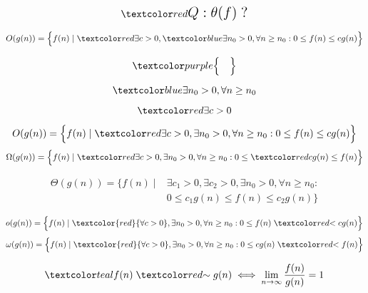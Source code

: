 
\begin{frame}{}
  \centerline{}


  \pause
  \vspace{-0.30cm}
  \[
    \red{\text{\Large $Q: \theta(f)\;?$}}
  \]
\end{frame}

\begin{frame}{}
  \[
	O(g(n)) = \Big\{f(n) \mid \red{\exists c > 0}, \blue{\exists n_0 > 0, \forall n \ge n_0}: 0 \le f(n) \le c g(n)\Big\}
  \]

  \pause
  \[
	\purple{\Big\{ \quad \Big\}}
  \]

  \pause
  \[
	\blue{\exists n_0 > 0, \forall n \ge n_0}
  \]

  \pause
  \[
	\red{\exists c > 0}
  \]
\end{frame}

\begin{frame}{}
  \[
	O(g(n)) = \Big\{f(n) \mid \red{\exists} c > 0, \exists n_0 > 0, \forall n \ge n_0: 0 \le f(n) \le c g(n)\Big\}
  \]
  \[
	\Omega(g(n)) = \Big\{f(n) \mid \red{\exists} c > 0, \exists n_0 > 0, \forall n \ge n_0: 0 \le \red{c} g(n) \le f(n) \Big\}
  \]

  \pause
  \begin{align*}
    \Theta(g(n)) = \Big\{f(n) \mid &\exists c_1 > 0, \exists c_2 >0, \exists n_0 > 0, \forall n \ge n_0: \\ 
								   & 0 \le c_1 g(n) \le f(n) \le c_2 g(n)\Big\}
  \end{align*}

  \pause
  \[
	o(g(n)) = \Big\{f(n) \mid \textcolor{red}{\forall c > 0}, \exists n_0 > 0, \forall n \ge n_0: 0 \le f(n) \;\red{<}\; c g(n)\Big\}
  \]
  \[
	\omega(g(n)) = \Big\{f(n) \mid \textcolor{red}{\forall c > 0}, \exists n_0 > 0, \forall n \ge n_0: 0 \le c g(n) \;\red{<}\; f(n)\Big\}
  \]

  \pause
  \[
	\teal{f(n) \;\red{\sim}\; g(n) \iff \lim_{n \to \infty} \frac{f(n)}{g(n)} = 1}
  \]
\end{frame}

